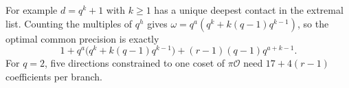For example $d=q^k+1$ with $k\ge1$ has a unique deepest contact in the extremal list. Counting the multiples of $q^h$ gives $\omega=q^a(q^k+k(q-1)q^{k-1})$, so the optimal common precision is exactly
\[
  1+q^a\big(q^k+k(q-1)q^{k-1}\big)+(r-1)(q-1)q^{a+k-1}.
\]
For $q=2$, five directions constrained to one coset of $\pi\mathcal O$ need $17+4(r-1)$ coefficients per branch.
